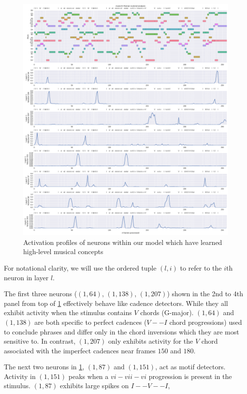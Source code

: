 \begin{figure}[tb]
    \centering
    \includegraphics[width=1.0\linewidth]{model-analysis-cells-individual.png}
    \caption{Activation profiles of neurons within our model which have learned
    high-level musical concepts}
    \label{fig:model-analysis-cells-individual}
\end{figure}

For notational clarity, we will use the ordered tuple $(l,i)$ to refer to the
$i$th neuron in layer $l$.

The first three neurons ($(1,64)$, $(1,138)$, $(1,207)$) shown in the 2nd to
4th panel from top of \cref{fig:model-analysis-cells-individual} effectively
behave like cadence detectors. While they all exhibit activity when the
stimulus contains $V$ chords (\ie G-major). $(1,64)$ and $(1,138)$ are both
specific to perfect cadences (\ie $V -- I$ chord progressions) used to
conclude phrases and differ only in the chord inversions which they are most
sensitive to. In contrast, $(1,207)$ only exhibits activity for the $V$ chord
associated with the imperfect cadences near frames $150$ and $180$.

The next two neurons in \cref{fig:model-analysis-cells-individual}, $(1,87)$
and $(1,151)$, act as motif detectors. Activity in $(1,151)$ peaks when a $vi-vii-vi$
progression is present in the stimulus. $(1,87)$ exhibits large spikes on $I--V--I$,

